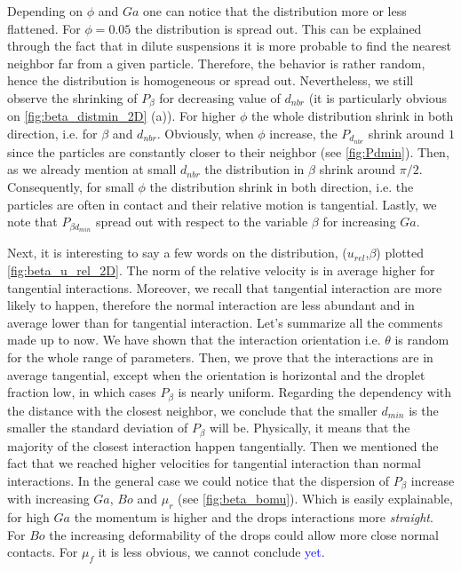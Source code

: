Depending on $\phi$ and $Ga$ one can notice that the distribution more or less flattened.   
For $\phi = 0.05$ the distribution is spread out. 
This can be explained through the fact that in dilute suspensions it is more probable to find the nearest neighbor far from a given particle. 
Therefore, the behavior is rather random, hence the distribution is homogeneous or spread out. 
Nevertheless, we still observe the shrinking of $P_\beta$ for decreasing value of $d_{nbr}$ (it is particularly obvious on \ref{fig:beta_distmin_2D} (a)). 
For higher $\phi$ the whole distribution shrink in both direction, i.e. for $\beta$ and $d_{nbr}$.
Obviously, when $\phi$ increase, the $P_{d_{nbr}}$ shrink around $1$ since the particles are constantly closer to their neighbor (see  \ref{fig:Pdmin}). 
Then, as we already mention at small $d_{nbr}$ the distribution in $\beta$ shrink around $\pi/2$.
Consequently, for small $\phi$ the distribution shrink in both direction, i.e. the particles are often in contact and their relative motion is tangential. 
Lastly, we note that $P_{\beta d_{min}}$ spread out with respect to the variable $\beta$ for increasing $Ga$. 

Next, it is interesting to say a few words on the distribution, ($u_{rel}$,$\beta$) plotted \ref{fig:beta_u_rel_2D}. 
The norm of the relative velocity is in average higher for tangential interactions.
Moreover, we recall that tangential interaction are more likely to happen, therefore the normal interaction are less abundant and in average lower than for tangential interaction. 
Let's summarize all the comments made up to now. 
We have shown that the interaction orientation i.e. $\theta$ is random for the whole range of parameters.
Then, we prove that the interactions are in average tangential, except when the orientation is horizontal and the droplet fraction low, in which cases $P_\beta$ is nearly uniform. 
Regarding the dependency with the distance with the closest neighbor, we conclude that the smaller $d_{min}$ is the smaller the standard deviation of $P_\beta$ will be. 
Physically, it means that the majority of the closest interaction happen tangentially. 
Then we mentioned the fact that we reached higher velocities for tangential interaction than normal interactions. 
In the general case we could notice that the dispersion of $P_\beta$ increase with increasing $Ga$, $Bo$ and $\mu_r$ (see \ref{fig:beta_bomu}). 
Which is easily explainable, for high $Ga$ the momentum is higher and the drops interactions more \textit{straight}. 
For $Bo$ the increasing deformability of the drops could allow more close normal contacts.
For $\mu_f$ it is less obvious, we cannot conclude \textcolor{blue}{yet}. 


